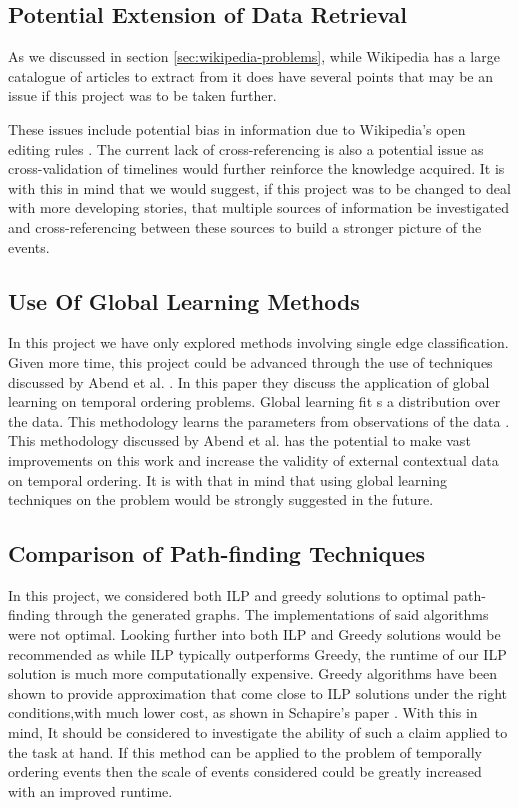 \documentclass[bsc,frontabs,twoside,singlespacing,parskip,deptreport]{infthesis}     %
\begin{document}
\subsection{Potential Extension of Data Retrieval}
As we discussed in section \ref{sec:wikipedia-problems}, while Wikipedia has a large catalogue of articles to extract from
it does have several points that may be an issue if this project was to be taken further.

These issues include potential bias in information due to Wikipedia's open editing rules \cite{wikipediaeditrules}. The current lack of
cross-referencing is also a potential issue as cross-validation of timelines would further reinforce the knowledge acquired.
It is with this in mind that we would suggest, if this project was to be changed to deal with more developing stories, that
multiple sources of  information be investigated and cross-referencing between these sources to build a stronger picture of
the events.


\subsection{Use Of Global Learning Methods}
In this project we have only explored methods involving single edge classification. Given more time,
this project could be advanced through the use of techniques discussed by Abend et al. \cite{abend2015lexical}.
In this paper they discuss the application of global learning on temporal ordering problems. Global learning
fit s a distribution over the data. This methodology learns the parameters from observations of the data \cite{Huang2008}.
This methodology discussed by Abend et al. has the potential to make vast improvements on this work and increase the validity
of external contextual data on temporal ordering. It is with that in mind that using global learning techniques on the problem
would be strongly suggested in the future.

\subsection{Comparison of Path-finding Techniques}
In this project, we considered both ILP and greedy solutions to optimal path-finding through the generated graphs.
The implementations of said algorithms were not optimal. Looking further into both ILP and Greedy solutions would
be recommended as while ILP typically outperforms Greedy, the runtime of our ILP solution is much more computationally
expensive. Greedy algorithms have been shown to provide approximation that come close to ILP solutions under the right
conditions,with much lower cost, as shown in Schapire's paper \cite{schapire1998learning}. With this in mind,
It should be considered to investigate the ability of such a claim applied to the task at hand. If this method can
be applied to the problem of temporally ordering events then the scale of events considered could be greatly increased with
an improved runtime.
\end{document}
